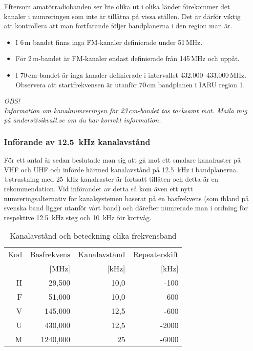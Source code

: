 Eftersom amatörradiobanden ser lite olika ut i olika länder förekommer
det kanaler i numreringen som inte är tillåtna på vissa ställen. Det
är därför viktig att kontrollera att man fortfarande följer
bandplanerna i den region man är.

\begin{itemize}
\item I 6\,m bandet finns inga FM-kanaler definierade under 51\,MHz.
\item För 2\,m-bandet är FM-kanaler endast definierade från 145\,MHz och uppåt.
\item I 70\,cm-bandet är inga kanaler definierade i intervallet
  432.000--433.000\,MHz. Observera att startfrekvensen är utanför
  70\,cm bandplanen i IARU region 1.
\end{itemize}

\textit{OBS!\\ Information om kanalnumreringen för 23\,cm-bandet tas
  tacksamt mot. Maila mig på anders@sikvall.se om du har korrekt
  information.}

\subsubsection{Införande av 12.5~kHz kanalavstånd}

För ett antal år sedan beslutade man sig att gå mot ett smalare
kanalraster på VHF och UHF och införde härmed kanalavstånd på 12.5~kHz
i bandplanerna. Ustrustning med 25~kHz kanalraster är fortsatt
tillåten och detta är en rekommendation. Vid införandet av detta så
kom även ett nytt numreringsalternativ för kanalsystemen baserat på en
basfrekvens (som ibland på svenska band ligger utanför vårt band) och
därefter numrerade man i ordning för respektive 12.5~kHz steg och
10~kHz för kortvåg.

\begin{table}[h]
\centering
\begin{tabular}{rrrr}
Kod & Basfrekvens & Kanalavstånd & Repeaterskift \\
    & [MHz]       & [kHz]        & [kHz] \\ \hline
H & 29,500 & 10,0 & -100 \\
F & 51,000 & 10,0 & -600 \\
V & 145,000& 12,5 & -600 \\
U & 430,000& 12,5 & -2000 \\
M & 1240,000 & 25 & -6000 \\
\end{tabular}
\label{tab:kanalavstand}
\caption{Kanalavstånd och beteckning olika frekvensband}
\end{table}

